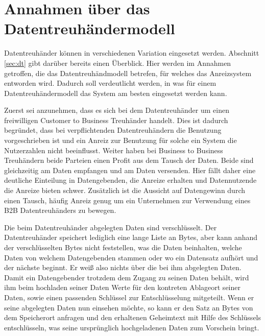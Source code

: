 \documentclass{scrreprt}
\begin{document}
\section{Annahmen über das Datentreuhändermodell}
Datentreuhänder können in verschiedenen Variation eingesetzt werden. Abschnitt \ref{sec:dt} gibt darüber bereits einen Überblick. Hier werden im Annahmen getroffen, die das Datentreuhändmodell betrefen, für welches das Anreizsystem entworden wird. Dadurch soll verdeutlicht werden, in was für einem Datentreuhändermodell das System am besten eingesetzt werden kann.

Zuerst sei anzunehmen, dass es sich bei dem Datentreuhänder um einen freiwilligen Customer to Business Treuhänder handelt. Dies ist dadurch begründet, dass bei verpflichtenden Datentreuhändern die Benutzung vorgeschrieben ist und ein Anreiz zur Benutzung für solche ein System die Nutzerzahlen nicht beeinflusst. Weiter haben bei Business to Business Treuhändern beide Parteien einen Profit aus dem Tausch der Daten. Beide sind gleichzeitig am Daten empfangen und am Daten versenden. Hier fällt daher eine deutliche Einteilung in Datengebenden, die Anreize erhalten und Datennutzende die Anreize bieten schwer. Zusätzlich ist die Aussicht auf Datengewinn durch einen Tausch, häufig Anreiz genug um ein Unternehmen zur Verwendung eines B2B Datentreuhänders zu bewegen. 

Die beim Datentreuhänder abgelegten Daten sind verschlüsselt. Der Datentreuhänder speichert lediglich eine lange Liste an Bytes, aber kann anhand der verschlüsselten Bytes nicht feststellen, was die Daten beinhalten, welche Daten von welchem Datengebenden stammen oder wo ein Datensatz aufhört und der nächste beginnt. Er weiß also nichts über die bei ihm abgelegten Daten. Damit ein Datengebender trotzdem dem Zugang zu seinen Daten behält, wird ihm beim hochladen seiner Daten Werte für den kontreten Ablageort seiner Daten, sowie einen passenden Schlüssel zur Entschlüsselung mitgeteilt. Wenn er seine abgelegten Daten nun einsehen möchte, so kann er den Satz an Bytes von dem Speicherort anfragen und den erhaltenen Geheimtext mit Hilfe des Schlüssels entschlüsseln, was seine ursprünglich hochgeladenen Daten zum Vorschein bringt.
\end{document}
